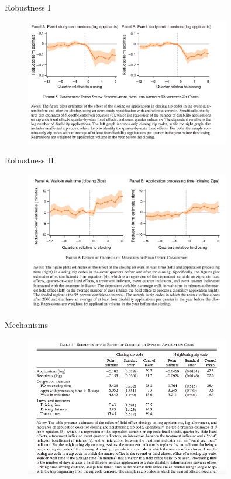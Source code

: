 \documentclass{beamer}
\begin{document}
\begin{frame}{Robustness I}
    \begin{figure}
        \centering
        \includegraphics[width=0.8\textwidth]{F5.png}
    \end{figure}
\end{frame}

\begin{frame}{Robustness II}
    \begin{figure}
        \centering
        \includegraphics[width=0.8\textwidth]{F6.png}
    \end{figure}
\end{frame}

\begin{frame}{Mechanisms}
    \begin{figure}
        \centering
        \includegraphics[width=0.8\textwidth]{T4.png}
    \end{figure}
\end{frame}
\end{document}

